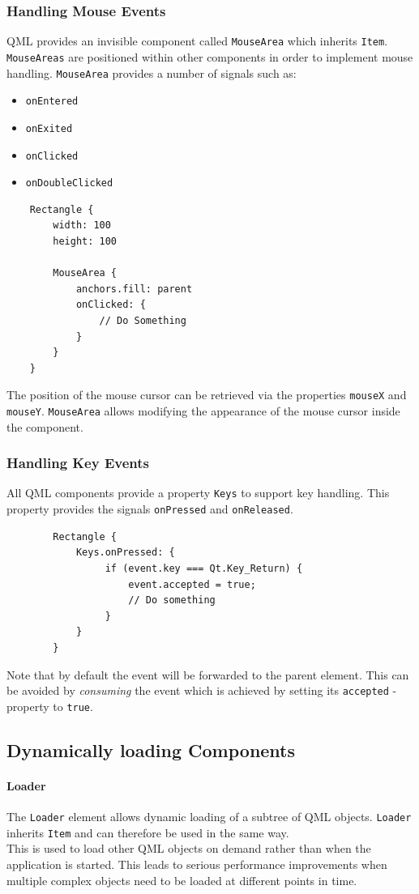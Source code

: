\subsubsection{Handling Mouse Events}
QML provides an invisible component called {\tt MouseArea} which inherits {\tt Item}. {\tt MouseAreas} are positioned within other components in order to implement mouse handling. {\tt MouseArea} provides a number of signals such as:
\begin {itemize}
	\item{{\tt onEntered}}
	\item{{\tt onExited}}
	\item{{\tt onClicked}}
	\item{{\tt onDoubleClicked}}
\end{itemize}
\begin{lstlisting}
	Rectangle {
	    width: 100
	    height: 100

	    MouseArea {
	        anchors.fill: parent
	        onClicked: {
	            // Do Something
	        }
	    }
	}
\end{lstlisting}
The position of the mouse cursor can be retrieved via the properties {\tt mouseX} and {\tt mouseY}.
{\tt MouseArea} allows modifying the appearance of the mouse cursor inside the component.
\subsubsection{Handling Key Events}
All QML components provide a property {\tt Keys} to support key handling. This property provides the signals {\tt onPressed} and {\tt onReleased}.
	\begin{lstlisting}
		Rectangle {
	     	Keys.onPressed: {
		         if (event.key === Qt.Key_Return) {
		             event.accepted = true;
		             // Do something
		         }
	     	}
		}
	\end{lstlisting}
Note that by default the event will be forwarded to the parent element. This can be avoided by \textit{consuming} the event which is achieved by setting its {\tt accepted} -property to {\tt true}.
\subsection {Dynamically loading Components}
\paragraph{Loader}
The {\tt Loader} element allows dynamic loading of a subtree of QML objects. {\tt Loader} inherits {\tt Item} and can therefore be used in the same way. \\
This is used to load other QML objects on demand rather than when the application is started.  This leads to serious performance improvements when multiple complex objects need to be loaded at different points in time. 
